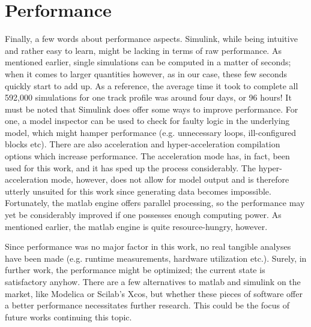 \section{Performance}
\label{sec:Performance}
\par\noindent
Finally, a few words about performance aspects. Simulink, while being intuitive and rather easy to learn, might be lacking in terms of raw performance. As mentioned earlier, single simulations can be computed in a matter of seconds; when it comes to larger quantities however, as in our case, these few seconds quickly start to add up. As a reference, the average time it took to complete all 592,000 simulations for one track profile was around four days, or 96 hours! It must be noted that Simulink does offer some ways to improve performance. For one, a model inspector can be used to check for faulty logic in the underlying model, which might hamper performance (e.g. unnecessary loops, ill-configured blocks etc). There are also acceleration and hyper-acceleration compilation options which increase performance. The acceleration mode has, in fact, been used for this work, and it has sped up the process considerably. The hyper-acceleration mode, however, does not allow for model output and is therefore utterly unsuited for this work since generating data becomes impossible. Fortunately, the matlab engine offers parallel processing, so the performance may yet be considerably improved if one possesses enough computing power. As mentioned earlier, the matlab engine is quite resource-hungry, however. 
\par
Since performance was no major factor in this work, no real tangible analyses have been made (e.g. runtime measurements, hardware utilization etc.). Surely, in further work, the performance might be optimized; the current state is satisfactory anyhow. There are a few alternatives to matlab and simulink on the market, like Modelica or Scilab's Xcos, but whether these pieces of software offer a better performance necessitates further research. This could be the focus of future works continuing this topic.